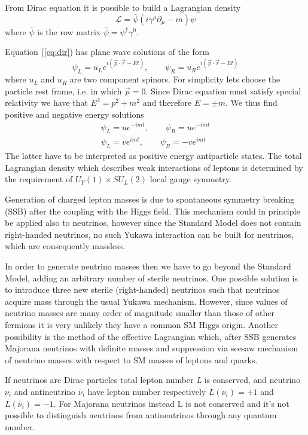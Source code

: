 \documentclass{subnucbo}
\begin{document}
From Dirac equation it is possible to build a Lagrangian density
\begin{equation}
\label{eq:DirLag}
\mathcal{L}=\bar{\psi}(i\gamma^{\mu}\partial_{\mu}-m)\psi
\end{equation}
where $\bar{\psi}$ is the row matrix $\bar{\psi}=\psi^{\dagger}\gamma^0$.

Equation (\ref{eq:dir}) has plane wave solutions of the form
\begin{equation}
\psi_L=u_Le^{i(\vec{p}\cdot\vec{r}-Et)},
\qquad
\psi_R=u_Re^{i(\vec{p}\cdot\vec{r}-Et)}
\end{equation}
where $u_L$ and $u_R$ are two component spinors. For simplicity lets choose the particle rest frame, i.e. in which $\vec{p}=0$. Since Dirac equation must satisfy special relativity we have that $E^2=p^2+m^2$ and therefore $E=\pm m$. We thus find positive and negative energy solutions%
\begin{gather}
\psi_L=ue^{-imt},\qquad  \psi_R=ue^{-imt} \\
\psi_L=ve^{imt},\qquad  \psi_R=-ve^{imt}
\end{gather}
The latter have to be interpreted as positive energy antiparticle states.
The total Lagrangian density which describes weak interactions of leptons is determined by the requirement of $U_Y(1)\times SU_L(2)$ local gauge symmetry.

Generation of charged lepton masses is due to spontaneous symmetry breaking (SSB) after the coupling with the Higgs field.
This mechanism could in principle be applied also to neutrinos, however since the Standard Model does not contain right-handed neutrinos, no such Yukawa interaction can be built for neutrinos, which are consequently massless.

In order to generate neutrino masses then we have to go beyond the Standard Model, adding an arbitrary number of sterile neutrinos.
One possible solution is to introduce three new sterile (right-handed) neutrinos such that neutrinos acquire mass through the usual Yukawa mechanism.  However, since values of neutrino masses are many order of magnitude smaller than those of other fermions it is very unlikely they have a common SM Higgs origin.
Another possibility is the method of the effective Lagrangian which, after SSB generates Majorana neutrinos with definite masses and suppression via seesaw mechanism of neutrino masses with respect to SM masses of leptons and quarks.

If neutrinos are Dirac particles total lepton number \emph{L} is conserved, and neutrino $\nu_i$ and antineutrino $\bar{\nu}_i$ have lepton number respectively  $L(\nu_i)=+1$ and $L(\bar{\nu}_i)=-1$.
For Majorana neutrinos instead L is not conserved and it's not possible to distinguish neutrinos from antineutrinos through any quantum number.
\end{document}
